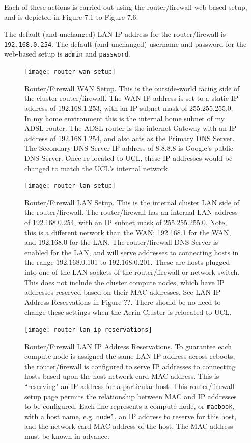 \documentclass{report}
\begin{document}
Each of these actions is carried out using the router/firewall web-based setup, and is depicted in Figure 7.1 to Figure 7.6.

The default (and unchanged) LAN IP address for the router/firewall is \verb|192.168.0.254|. The default (and unchanged) username and password for the web-based setup is \verb|admin| and \verb|password|.

\begin{figure}[H]
	\centering	
	\texttt{[image: router-wan-setup]}
	\caption{Router/Firewall WAN Setup. This is the outside-world facing side of the cluster router/firewall. The WAN IP address is set to a static IP address of 192.168.1.253, with an IP subnet mask of 255.255.255.0. In my home environment this is the internal home subnet of my ADSL router. The ADSL router is the internet Gateway with an IP address of 192.168.1.254, and also acts as the Primary DNS Server. The Secondary DNS Server IP address of 8.8.8.8 is Google's public DNS Server. Once re-located to UCL, these IP addresses would be changed to match the UCL's internal network.}
\end{figure}

\begin{figure}[H]
	\centering	
	\texttt{[image: router-lan-setup]}
	\caption{Router/Firewall LAN Setup. This is the internal cluster LAN side of the router/firewall. The router/firewall has an internal LAN address of 192.168.0.254, with an IP subnet mask of 255.255.255.0. Note, this is a different network than the WAN; 192.168.1 for the WAN, and 192.168.0 for the LAN. The router/firewall DNS Server is enabled for the LAN, and will serve addresses to connecting hosts in the range 192.168.0.101 to 192.168.0.201. These are hosts plugged into one of the LAN sockets of the router/firewall or network switch. This does not include the cluster compute nodes, which have IP addresses reserved based on their MAC addresses. See LAN IP Address Reservations in Figure ??. There should be no need to change these settings when the Aerin Cluster is relocated to UCL.}
\end{figure}

\begin{figure}[H]
	\centering	
	\texttt{[image: router-lan-ip-reservations]}
	\caption{Router/Firewall LAN IP Address Reservations. To guarantee each compute node is assigned the same LAN IP address across reboots, the router/firewall is configured to serve IP addresses to connecting hosts based upon the host network card MAC address. This is ``reserving" an IP address for a particular host. This router/firewall setup page permits the relationship between MAC and IP addresses to be configured. Each line represents a compute node, or \texttt{macbook}, with a host name, e.g. \texttt{node1}, an IP address to reserve for this host, and the network card MAC address of the host. The MAC address must be known in advance.}
\end{figure}
\end{document}
